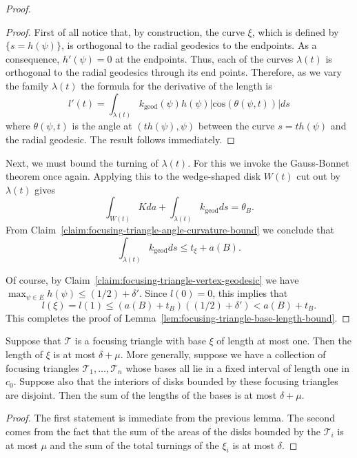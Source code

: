 \begin{proof}
\begin{proof}
First of all notice that, by construction,  the curve $\xi$, which
is defined by $\{s=h(\psi)\}$, is orthogonal to the radial geodesics
to the endpoints. As a consequence, $h'(\psi)=0$ at the endpoints.
Thus, each of the curves $\lambda(t)$ is orthogonal to the radial
geodesics through its end points. Therefore, as we vary the family
$\lambda(t)$ the formula for the derivative of the length is
$$l'(t)=\int_{\lambda(t)}k_\mathrm{geod}(\psi)h(\psi)|\mathrm{cos}(\theta(\psi,t))|ds$$ where $\theta(\psi,t)$ is the angle at
$(th(\psi),\psi)$ between the curve $s=th(\psi)$ and the radial
geodesic. The result follows immediately.
\end{proof}

Next, we must bound the turning of $\lambda(t)$. For this we invoke the
Gauss-Bonnet theorem once again. Applying this to the wedge-shaped disk $W(t)$
cut out by $\lambda(t)$ gives
$$\int_{W(t)}Kda+\int_{\lambda(t)}k_\mathrm{geod}ds=\theta_B.$$
From Claim~\ref{claim:focusing-triangle-angle-curvature-bound} we conclude that
$$\int_{\lambda(t)}k_\mathrm{geod}ds\le t_\xi+a(B).$$


Of course, by Claim~\ref{claim:focusing-triangle-vertex-geodesic} we have $\max_{\psi\in
E}h(\psi)\le (1/2)+\delta'$. Since $l(0)=0$, this implies that
$$l(\xi)=l(1)\le (a(B)+t_B)((1/2)+\delta')<a(B)+t_B.$$
This completes the proof of Lemma~\ref{lem:focusing-triangle-base-length-bound}.
\end{proof}

\begin{corollary}
\label{cor:focusing-triangle-base-bound-collection}
\label{muepsbd}
Suppose that ${\mathcal T}$ is a focusing triangle with base $\xi$
of length at most one. Then the length of $\xi$ is at most
$\delta+\mu$. More generally, suppose we have a collection of
focusing triangles ${\mathcal T}_1,\ldots,{\mathcal T}_n$ whose
bases all lie in a fixed interval of length one in $c_0$. Suppose
also that the interiors of disks bounded by these focusing triangles
are disjoint. Then the sum of the lengths of the bases is at  most
$\delta+\mu$.
\end{corollary}

\begin{proof}
The first statement is immediate from the previous lemma. The second
comes from the fact that the sum of the areas of the disks bounded
by the ${\mathcal T}_i$ is at most $\mu$ and the sum of the total
turnings of the $\xi_i$ is at most $\delta$.
\end{proof}


